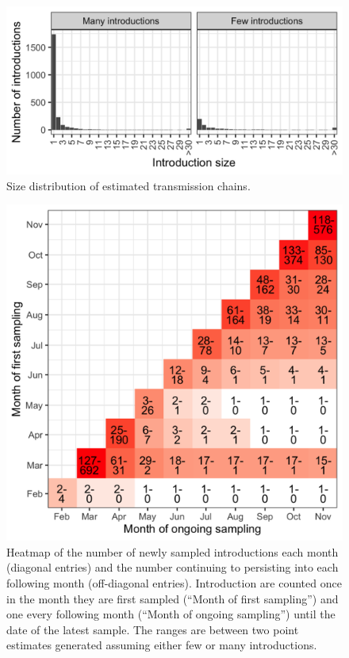 \documentclass[9pt,twoside,lineno]{pnas-new}
\begin{document}
\begin{figure}[H]
\centering
\includegraphics[width = 11.4cm]{figures/chain_size_dist.png}
\caption{Size distribution of estimated transmission chains.}  
\label{fig:chain_size_dist}
\end{figure}

\begin{figure}[H]
\centering
\includegraphics[width = 11.4cm]{figures/chain_longevity_matrix.png}
\caption{Heatmap of the number of newly sampled introductions each month (diagonal entries) and the number continuing to persisting into each following month (off-diagonal entries). Introduction are counted once in the month they are first sampled (``Month of first sampling'') and one every following month (``Month of ongoing sampling'') until the date of the latest sample. The ranges are between two point estimates generated assuming either few or many introductions.}  
\label{fig:chain-longevity-matrix}
\end{figure}
\end{document}
